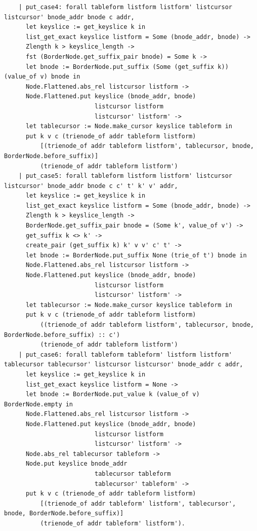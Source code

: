 \documentclass[runningheads]{llncs}
\begin{document}
\begin{verbatim}
    | put_case4: forall tableform listform listform' listcursor listcursor' bnode_addr bnode c addr,
      let keyslice := get_keyslice k in
      list_get_exact keyslice listform = Some (bnode_addr, bnode) ->
      Zlength k > keyslice_length ->
      fst (BorderNode.get_suffix_pair bnode) = Some k ->
      let bnode := BorderNode.put_suffix (Some (get_suffix k)) (value_of v) bnode in
      Node.Flattened.abs_rel listcursor listform ->
      Node.Flattened.put keyslice (bnode_addr, bnode)
                         listcursor listform
                         listcursor' listform' ->
      let tablecursor := Node.make_cursor keyslice tableform in
      put k v c (trienode_of addr tableform listform)
          [(trienode_of addr tableform listform', tablecursor, bnode, BorderNode.before_suffix)]
          (trienode_of addr tableform listform')
    | put_case5: forall tableform listform listform' listcursor listcursor' bnode_addr bnode c c' t' k' v' addr,
      let keyslice := get_keyslice k in
      list_get_exact keyslice listform = Some (bnode_addr, bnode) ->
      Zlength k > keyslice_length ->
      BorderNode.get_suffix_pair bnode = (Some k', value_of v') ->
      get_suffix k <> k' ->
      create_pair (get_suffix k) k' v v' c' t' ->
      let bnode := BorderNode.put_suffix None (trie_of t') bnode in
      Node.Flattened.abs_rel listcursor listform ->
      Node.Flattened.put keyslice (bnode_addr, bnode)
                         listcursor listform
                         listcursor' listform' ->
      let tablecursor := Node.make_cursor keyslice tableform in
      put k v c (trienode_of addr tableform listform)
          ((trienode_of addr tableform listform', tablecursor, bnode, BorderNode.before_suffix) :: c')
          (trienode_of addr tableform listform')
    | put_case6: forall tableform tableform' listform listform' tablecursor tablecursor' listcursor listcursor' bnode_addr c addr,
      let keyslice := get_keyslice k in
      list_get_exact keyslice listform = None ->
      let bnode := BorderNode.put_value k (value_of v) BorderNode.empty in
      Node.Flattened.abs_rel listcursor listform ->
      Node.Flattened.put keyslice (bnode_addr, bnode)
                         listcursor listform
                         listcursor' listform' ->
      Node.abs_rel tablecursor tableform ->
      Node.put keyslice bnode_addr
                         tablecursor tableform
                         tablecursor' tableform' ->
      put k v c (trienode_of addr tableform listform)
          [(trienode_of addr tableform' listform', tablecursor', bnode, BorderNode.before_suffix)]
          (trienode_of addr tableform' listform').


\end{verbatim}
\end{document}
